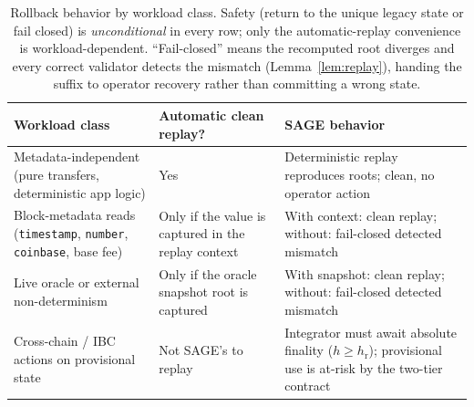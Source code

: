 \documentclass[journal]{IEEEtran}
\theoremstyle{definition}
\theoremstyle{remark}
\begin{document}
\begin{table}[t]
\centering
\caption{Rollback behavior by workload class. Safety (return to the unique legacy state or
fail closed) is \emph{unconditional} in every row; only the automatic-replay convenience is
workload-dependent. ``Fail-closed'' means the recomputed root diverges and every correct validator
detects the mismatch (Lemma~\ref{lem:replay}), handing the suffix to operator recovery rather than
committing a wrong state.}
\label{tab:rollback-compat}
\setlength{\tabcolsep}{4pt}
\renewcommand{\arraystretch}{1.2}
\footnotesize
\begin{tabular}{p{}p{}p{}}
\toprule
Workload class & Automatic clean replay? & SAGE behavior \\
\midrule
Metadata-independent (pure transfers, deterministic app logic) & Yes & Deterministic replay reproduces roots; clean, no operator action \\
Block-metadata reads (\texttt{timestamp}, \texttt{number}, \texttt{coinbase}, base fee) & Only if the value is captured in the replay context & With context: clean replay; without: fail-closed detected mismatch \\
Live oracle or external non-determinism & Only if the oracle snapshot root is captured & With snapshot: clean replay; without: fail-closed detected mismatch \\
Cross-chain / IBC actions on provisional state & Not SAGE's to replay & Integrator must await absolute finality ($h\ge h_{\mathrm{r}}$); provisional use is at-risk by the two-tier contract \\
\bottomrule
\end{tabular}
\end{table}
\end{document}
